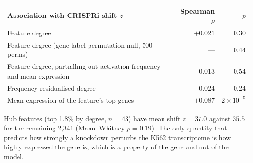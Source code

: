\documentclass[10pt,letterpaper]{article}
\begin{document}
\begin{center}
\begin{tabular}{lrr}
\toprule
Association with CRISPRi shift $z$ & Spearman $\rho$ & $p$ \\
\midrule
Feature degree & $+0.021$ & 0.30 \\
Feature degree (gene-label permutation null, 500 perms) & --- & 0.44 \\
Feature degree, partialling out activation frequency and mean expression & $-0.013$ & 0.54 \\
Frequency-residualised degree & $-0.024$ & 0.24 \\
Mean expression of the feature's top genes & $+0.087$ & $2\times10^{-5}$ \\
\bottomrule
\end{tabular}
\end{center}

Hub features (top 1.8\% by degree, $n=43$) have mean shift $z=37.0$ against $35.5$ for the remaining 2{,}341 (Mann--Whitney $p=0.19$). The only quantity that predicts how strongly a knockdown perturbs the K562 transcriptome is how highly expressed the gene is, which is a property of the gene and not of the model.
\end{document}
